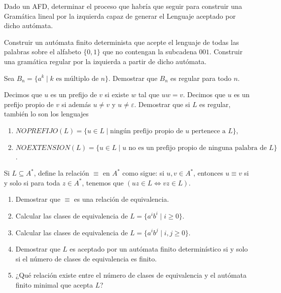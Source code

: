 \begin{ejercicio}
    Dado un AFD, determinar el proceso que habría que seguir para construir una Gramática lineal por la izquierda capaz de generar el Lenguaje aceptado por dicho autómata.
\end{ejercicio}

\begin{ejercicio}
    Construir un autómata finito determinista que acepte el lenguaje de todas las palabras sobre el alfabeto $\{0, 1\}$ que no contengan la subcadena $001$.
    Construir una gramática regular por la izquierda a partir de dicho autómata.
\end{ejercicio}

\begin{ejercicio}
    Sea $B_n = \{a^k \mid k \text{ es múltiplo de } n\}$. Demostrar que $B_n$ es regular para todo $n$.
\end{ejercicio}

\begin{ejercicio}
    Decimos que $u$ es un prefijo de $v$ si existe $w$ tal que $uw = v$. Decimos que $u$ es un prefijo propio de $v$ si además $u \neq v$ y $u \neq \varepsilon$. Demostrar que si $L$ es regular, también lo son los lenguajes
    \begin{enumerate}
        \item $NOPREFIJO(L) = \{u \in L \mid \text{ningún prefijo propio de } u \text{ pertenece a } L\}$,
        \item $NOEXTENSION(L) = \{u \in L \mid u \text{ no es un prefijo propio de ninguna palabra de } L\}$.
    \end{enumerate}
\end{ejercicio}

\begin{ejercicio}
    Si $L \subseteq A^*$, define la relación $\equiv$ en $A^*$ como sigue: si $u, v \in A^*$, entonces $u \equiv v$ si y solo si para toda $z \in A^*$, tenemos que $(uz \in L \Leftrightarrow vz \in L)$.
    \begin{enumerate}
        \item Demostrar que $\equiv$ es una relación de equivalencia.
        \item Calcular las clases de equivalencia de $L = \{a^ib^i \mid i \geq 0\}$.
        \item Calcular las clases de equivalencia de $L = \{a^ib^j \mid i, j \geq 0\}$.
        \item Demostrar que $L$ es aceptado por un autómata finito determinístico si y solo si el número de clases de equivalencia es finito.
        \item ¿Qué relación existe entre el número de clases de equivalencia y el autómata finito minimal que acepta $L$?
    \end{enumerate}
\end{ejercicio}

